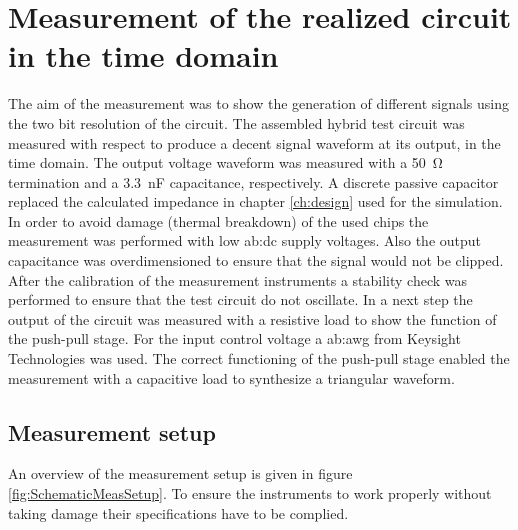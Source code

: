 \chapter{Measurement of the realized circuit in the time domain}

The aim of the measurement was to show the generation of different signals using the two bit resolution of the circuit.
The assembled hybrid test circuit was measured with respect to produce a decent signal waveform at its output, in the time domain.
The output voltage waveform was measured with a \SI{50}{\ohm} termination and a \SI{3.3}{\nano\farad} capacitance, respectively.
A discrete passive capacitor replaced the calculated impedance in chapter \ref{ch:design} used for the simulation.
In order to avoid damage (thermal breakdown) of the used chips the measurement was performed with low \gls{ab:dc} supply voltages.
Also the output capacitance was overdimensioned to ensure that the signal would not be clipped.
\\
After the calibration of the measurement instruments a stability check was performed to ensure that the test circuit do not oscillate.
In a next step the output of the circuit was measured with a resistive load to show the function of the push-pull stage.
For the input control voltage a \gls{ab:awg} from Keysight Technologies was used.
The correct functioning of the push-pull stage enabled the measurement with a capacitive load to synthesize a triangular waveform.


\section{Measurement setup}
An overview of the measurement setup is given in figure \ref{fig:SchematicMeasSetup}.
To ensure the instruments to work properly without taking damage their specifications have to be complied.




